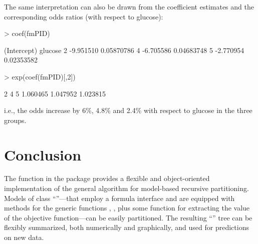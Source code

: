 \documentclass{Z}
\begin{document}
The same interpretation can also be drawn from the coefficient estimates
and the corresponding odds ratios (with respect to glucose):

\begin{Schunk}
\begin{Sinput}
> coef(fmPID)
\end{Sinput}
\begin{Soutput}
  (Intercept)    glucose
2   -9.951510 0.05870786
4   -6.705586 0.04683748
5   -2.770954 0.02353582
\end{Soutput}
\begin{Sinput}
> exp(coef(fmPID)[,2])
\end{Sinput}
\begin{Soutput}
       2        4        5 
1.060465 1.047952 1.023815 
\end{Soutput}
\end{Schunk}


i.e., the odds increase by 6\%, 4.8\% and 2.4\%
with respect to glucose in the three groups.



\section{Conclusion}
\label{sec:conclusion}

The function  in the  package provides a flexible and object-oriented
implementation of the general algorithm for model-based recursive partitioning.
Models of class ``''---that employ a formula interface and are equipped with
methods for the generic functions , ,  plus
some function for extracting the value of the objective function---can be easily partitioned.
The resulting ``'' tree can be flexibly summarized, both numerically and graphically,
and used for predictions on new data.



\end{document}
